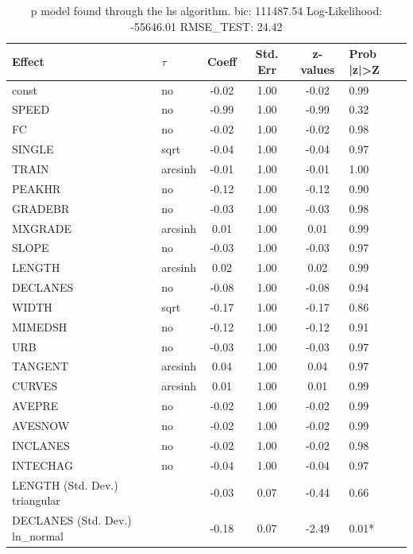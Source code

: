 \begin{table}
	\caption{p model found through the hs algorithm. bic: 111487.54 Log-Likelihood: -55646.01 RMSE_TEST: 24.42}
	\begin{center}
		\begin{tabular}{|l|l|c|c|c|l|}
			\hline
			Effect & $\tau$ & Coeff & Std. Err & z-values & Prob |z|>Z \\
			\hline
			const & no & -0.02 & 1.00 & -0.02 & 0.99 \\
			\hline
			SPEED & no & -0.99 & 1.00 & -0.99 & 0.32 \\
			\hline
			FC & no & -0.02 & 1.00 & -0.02 & 0.98 \\
			\hline
			SINGLE & sqrt & -0.04 & 1.00 & -0.04 & 0.97 \\
			\hline
			TRAIN & arcsinh & -0.01 & 1.00 & -0.01 & 1.00 \\
			\hline
			PEAKHR & no & -0.12 & 1.00 & -0.12 & 0.90 \\
			\hline
			GRADEBR & no & -0.03 & 1.00 & -0.03 & 0.98 \\
			\hline
			MXGRADE & arcsinh & 0.01 & 1.00 & 0.01 & 0.99 \\
			\hline
			SLOPE & no & -0.03 & 1.00 & -0.03 & 0.97 \\
			\hline
			LENGTH & arcsinh & 0.02 & 1.00 & 0.02 & 0.99 \\
			\hline
			DECLANES & no & -0.08 & 1.00 & -0.08 & 0.94 \\
			\hline
			WIDTH & sqrt & -0.17 & 1.00 & -0.17 & 0.86 \\
			\hline
			MIMEDSH & no & -0.12 & 1.00 & -0.12 & 0.91 \\
			\hline
			URB & no & -0.03 & 1.00 & -0.03 & 0.97 \\
			\hline
			TANGENT & arcsinh & 0.04 & 1.00 & 0.04 & 0.97 \\
			\hline
			CURVES & arcsinh & 0.01 & 1.00 & 0.01 & 0.99 \\
			\hline
			AVEPRE & no & -0.02 & 1.00 & -0.02 & 0.99 \\
			\hline
			AVESNOW & no & -0.02 & 1.00 & -0.02 & 0.99 \\
			\hline
			INCLANES & no & -0.02 & 1.00 & -0.02 & 0.98 \\
			\hline
			INTECHAG & no & -0.04 & 1.00 & -0.04 & 0.97 \\
			\hline
			LENGTH (Std. Dev.) triangular &  & -0.03 & 0.07 & -0.44 & 0.66 \\
			\hline
			DECLANES (Std. Dev.) ln_normal &  & -0.18 & 0.07 & -2.49 & 0.01* \\

\end{tabular}
\end{center}
\end{table}
